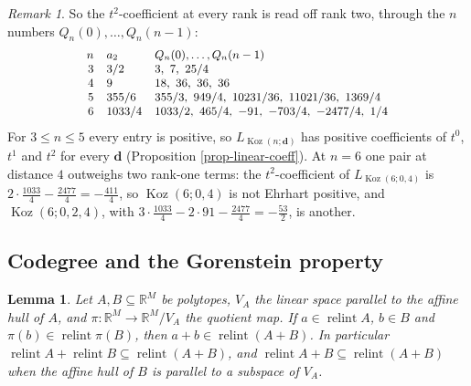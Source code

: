 \documentclass[11pt, a4paper, abstract=yes]{scrartcl}
\theoremstyle{definition}
\theoremstyle{remark}
\newtheorem{remark}[definition]{Remark}
\theoremstyle{plain}
\newtheorem{lemma}[definition]{Lemma}
\newcommand{\vek}[1]{\boldsymbol{#1}}
\theoremstyle{remark}
\theoremstyle{plain}
\newcommand{\Koz}{\operatorname{Koz}}
\newcommand{\relint}{\operatorname{relint}}
\newcommand{\leannone}{\tikz[baseline=-0.6ex]\draw[leannone,line width=0.6pt] (0,0) circle (0.55ex);}
\newcommand{\leanmark}[1]{\leavevmode{\reversemarginpar\marginnote{\raggedleft#1}}}
\begin{document}
\begin{remark}
So the \(t^2\)-coefficient at every rank is read off rank two, through the \(n\) numbers
\(Q_n(0),\dots,Q_n(n-1)\):
\[\small
\begin{array}{rll}
n & a_2 & Q_n(0),\dots,Q_n(n-1)\\
3 & 3/2 & 3,\ 7,\ 25/4\\
4 & 9 & 18,\ 36,\ 36,\ 36\\
5 & 355/6 & 355/3,\ 949/4,\ 10231/36,\ 11021/36,\ 1369/4\\
6 & 1033/4 & 1033/2,\ 465/4,\ -91,\ -703/4,\ -2477/4,\ 1/4
\end{array}
\]
For \(3\le n\le5\) every entry is positive, so \(L_{\Koz(n;\vek d)}\) has positive coefficients of \(t^0\),
\(t^1\) and \(t^2\) for every \(\vek d\) (Proposition \ref{prop-linear-coeff}). At \(n=6\) one pair at
distance \(4\) outweighs two rank-one terms: the \(t^2\)-coefficient of \(L_{\Koz(6;0,4)}\) is
\(2\cdot\tfrac{1033}4-\tfrac{2477}4=-\tfrac{411}4\), so \(\Koz(6;0,4)\) is not Ehrhart positive, and
\(\Koz(6;0,2,4)\), with \(3\cdot\tfrac{1033}4-2\cdot91-\tfrac{2477}4=-\tfrac{53}2\), is another.
\label{rem-quadratic-coeff}
\end{remark}
\subsection{Codegree and the Gorenstein property}
\label{sec:orge4d9112}

\begin{lemma}
\leanmark{\leannone}Let \(A,B\subseteq\mathbb R^M\) be polytopes, \(V_A\) the linear space parallel to the affine hull of
\(A\), and \(\pi\colon\mathbb R^M\to\mathbb R^M/V_A\) the quotient map. If \(a\in\relint A\), \(b\in B\)
and \(\pi(b)\in\relint\pi(B)\), then \(a+b\in\relint(A+B)\). In particular
\(\relint A+\relint B\subseteq\relint(A+B)\), and \(\relint A+B\subseteq\relint(A+B)\) when the affine hull of
\(B\) is parallel to a subspace of \(V_A\).
\label{lem-relint-sum}
\end{lemma}
\end{document}
